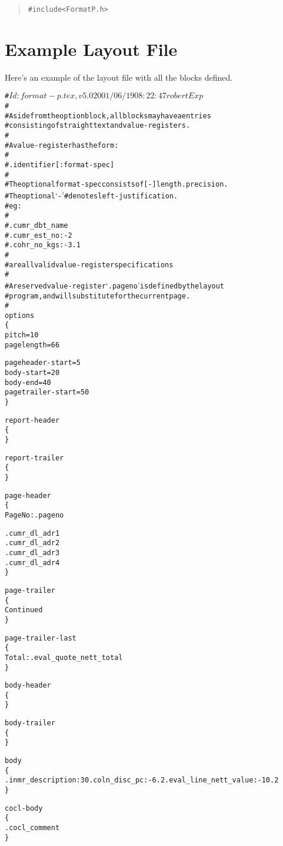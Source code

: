\documentclass[a4paper,twoside]{article}
\begin{document}
		\begin{quote}
			\begin{alltt}
			#include    <FormatP.h>
			\end{alltt}
		\end{quote}

\section{Example Layout File}

Here's an example of the layout file with all the blocks defined.

\begin{alltt}
#   $Id: format-p.tex,v 5.0 2001/06/19 08:22:47 robert Exp $
#
#   Aside from the option block, all blocks may have a entries
#   consisting of straight text and value-registers.
#
#   A value-register has the form:
#
#       .identifier[:format-spec]
#
#   The optional format-spec consists of [-]length.precision.
#   The optional `-' #  denotes left-justification.
#   eg:
#
#       .cumr_dbt_name
#       .cumr_est_no:-2
#       .cohr_no_kgs:-3.1
#
#   are all valid value-register specifications
#
#   A reserved value-register `.pageno' is defined by the layout
#   program, and will substitute for the current page.
#
options
\{
    pitch = 10
    pagelength = 66

    pageheader-start = 5
    body-start = 20
    body-end = 40
    pagetrailer-start = 50
\}

report-header
\{
\}

report-trailer
\{
\}

page-header
\{
                                   Page No: .pageno

         .cumr_dl_adr1
         .cumr_dl_adr2
         .cumr_dl_adr3
         .cumr_dl_adr4
\}

page-trailer
\{
       Continued
\}

page-trailer-last
\{
    Total: .eval_quote_nett_total
\}

body-header
\{
\}

body-trailer
\{
\}

body
\{
    .inmr_description:30  .coln_disc_pc:-6.2  .eval_line_nett_value:-10.2
\}

cocl-body
\{
    .cocl_comment
\}

\end{alltt}

\end{document}
